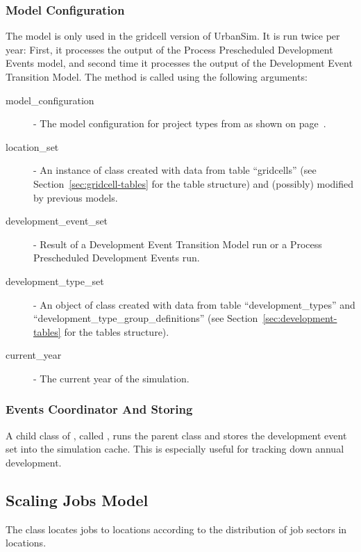 \subsubsection{Model Configuration}
%
The model is only used in the gridcell version of UrbanSim. It
is run twice per year: First, it processes the output of the 
Process Prescheduled Development Events model, and second time 
it processes the output of the Development Event Transition Model.
The method  is called using the
following arguments:
\begin{description}
\item[model_configuration] - The model configuration for project types from
   as shown on page~\pageref{page:model-configuration}.
\item[location_set] - An instance of class  created with
  data from table ``gridcells'' (see Section~\ref{sec:gridcell-tables} for the
  table structure) and (possibly) modified by previous models.
\item[development_event_set] - Result of a Development Event Transition Model
  run or a Process Prescheduled Development Events run.
\item[development_type_set] - An object of class 
  created with data from table ``development_types'' and
  ``development_type_group_definitions'' (see
  Section~\ref{sec:development-tables} for the tables structure).
\item[current_year] - The current year of the simulation.
\end{description}

\subsubsection{Events Coordinator And Storing}
%
A child class of , called ,
runs the parent class and stores the development event set into the simulation cache.
This is especially useful for tracking down annual development.


%
\subsection{Scaling Jobs Model}
%
\label{sec:scaling-jobs-model} 
%
The class  locates jobs to locations according to the
distribution of job sectors in locations.
